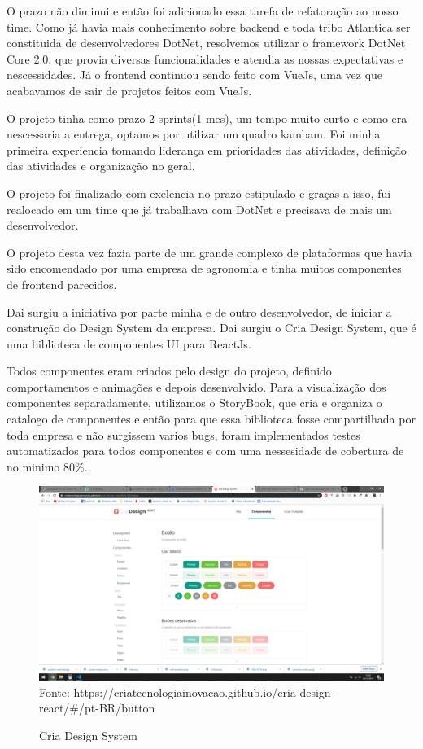 O prazo não diminui e então foi adicionado essa tarefa de refatoração ao nosso time.
Como já havia mais conhecimento sobre backend e toda tribo Atlantica ser constituida de desenvolvedores DotNet, resolvemos utilizar o framework DotNet Core 2.0, que 
provia diversas funcionalidades e atendia as nossas expectativas e nescessidades.
Já o frontend continuou sendo feito com VueJs, uma vez que acabavamos de sair de projetos feitos com VueJs.

O projeto tinha como prazo 2 sprints(1 mes), um tempo muito curto e como era nescessaria a entrega, optamos por utilizar um quadro kambam.
Foi minha primeira experiencia tomando liderança em prioridades das atividades, definição das atividades e organização no geral.

O projeto foi finalizado com exelencia no prazo estipulado e graças a isso, fui realocado em um time que já trabalhava com DotNet e precisava de mais um desenvolvedor.

O projeto desta vez fazia parte de um grande complexo de plataformas que havia sido encomendado por uma empresa de agronomia e tinha muitos componentes de frontend parecidos.

Dai surgiu a iniciativa por parte minha e de outro desenvolvedor, de iniciar a construção do Design System da empresa.
Dai surgiu o Cria Design System, que é uma biblioteca de componentes UI para ReactJs.

Todos componentes eram criados pelo design do projeto, definido comportamentos e animações e depois desenvolvido. Para a visualização dos componentes separadamente, utilizamos o StoryBook,
que cria e organiza o catalogo de componentes e então para que essa biblioteca fosse compartilhada por toda empresa e não surgissem varios bugs, foram implementados testes automatizados para todos componentes e com uma nessesidade de cobertura de no minimo 80\%.

\begin{figure}[H]
\centering
\caption{Cria Design System} %
\includegraphics[scale=0.3]{cria-design}\\  %
{\small Fonte: https://criatecnologiainovacao.github.io/cria-design-react/#/pt-BR/button} %
\label{fig:exemplo} %
\end{figure}

